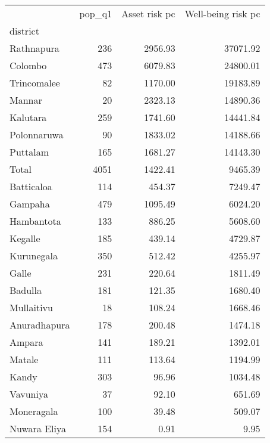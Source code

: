 \begin{tabular}{lrrr}
\toprule
{} &  pop\_q1 &  Asset risk pc &  Well-being risk pc \\
district     &         &                &                     \\
\midrule
Rathnapura   &     236 &        2956.93 &            37071.92 \\
Colombo      &     473 &        6079.83 &            24800.01 \\
Trincomalee  &      82 &        1170.00 &            19183.89 \\
Mannar       &      20 &        2323.13 &            14890.36 \\
Kalutara     &     259 &        1741.60 &            14441.84 \\
Polonnaruwa  &      90 &        1833.02 &            14188.66 \\
Puttalam     &     165 &        1681.27 &            14143.30 \\
Total        &    4051 &        1422.41 &             9465.39 \\
Batticaloa   &     114 &         454.37 &             7249.47 \\
Gampaha      &     479 &        1095.49 &             6024.20 \\
Hambantota   &     133 &         886.25 &             5608.60 \\
Kegalle      &     185 &         439.14 &             4729.87 \\
Kurunegala   &     350 &         512.42 &             4255.97 \\
Galle        &     231 &         220.64 &             1811.49 \\
Badulla      &     181 &         121.35 &             1680.40 \\
Mullaitivu   &      18 &         108.24 &             1668.46 \\
Anuradhapura &     178 &         200.48 &             1474.18 \\
Ampara       &     141 &         189.21 &             1392.01 \\
Matale       &     111 &         113.64 &             1194.99 \\
Kandy        &     303 &          96.96 &             1034.48 \\
Vavuniya     &      37 &          92.10 &              651.69 \\
Moneragala   &     100 &          39.48 &              509.07 \\
Nuwara Eliya &     154 &           0.91 &                9.95 \\
\bottomrule
\end{tabular}
